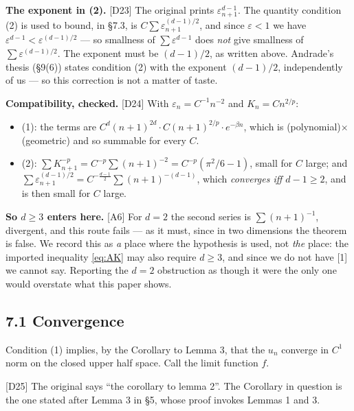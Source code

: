 \documentclass[11pt,reqno]{amsart}
\theoremstyle{plain}
\theoremstyle{definition}
\theoremstyle{plain}
\theoremstyle{definition}
\theoremstyle{remark}
\newcommand{\Ledger}[1]{{\scriptsize\textsf{[#1]}}}
\begin{document}
\begin{expansion}
\textbf{The exponent in (2).} \Ledger{D23} The original prints
$\varepsilon_{n+1}^{d-1}$. The quantity condition (2) is used to bound, in \S7.3, is
$C\sum\varepsilon_{n+1}^{(d-1)/2}$, and since $\varepsilon<1$ we have
$\varepsilon^{d-1}<\varepsilon^{(d-1)/2}$ --- so smallness of
$\sum\varepsilon^{d-1}$ does \emph{not} give smallness of
$\sum\varepsilon^{(d-1)/2}$. The exponent must be $(d-1)/2$, as written above. Andrade's thesis (\S9(6)) states condition (2) with the exponent $(d-1)/2$, independently of us --- so this correction is not a matter of taste.

\textbf{Compatibility, checked.} \Ledger{D24} With
$\varepsilon_n=C^{-1}n^{-2}$ and $K_n=Cn^{2/p}$:
\begin{itemize}[leftmargin=1.4em,itemsep=2pt]
\item (1): the terms are
  $C^{d}(n+1)^{2d}\cdot C(n+1)^{2/p}\cdot e^{-\beta n}$, which is
  (polynomial)$\times$(geometric) and so summable for every $C$.
\item (2): $\sum K_{n+1}^{-p}=C^{-p}\sum(n+1)^{-2}=C^{-p}(\pi^2/6-1)$, small for
  $C$ large; and
  $\sum\varepsilon_{n+1}^{(d-1)/2}
   =C^{-\frac{d-1}2}\sum(n+1)^{-(d-1)}$, which \emph{converges iff $d-1\ge2$}, and
  is then small for $C$ large.
\end{itemize}
\textbf{So $d\ge3$ enters here.} \Ledger{A6} For $d=2$ the second series is
$\sum(n+1)^{-1}$, divergent, and this route fails --- as it must, since in two
dimensions the theorem is false. We record this as \emph{a} place where the
hypothesis is used, not \emph{the} place: the imported inequality \eqref{eq:AK} may
also require $d\ge3$, and since we do not have [1] we cannot say. Reporting the
$d=2$ obstruction as though it were the only one would overstate what this paper
shows.
\end{expansion}

\subsection*{7.1 Convergence}

Condition (1) implies, by the Corollary to Lemma 3, that the $u_n$ converge in $C^1$
norm on the closed upper half space. Call the limit function $f$.

\begin{expansion}
\Ledger{D25} The original says ``the corollary to lemma 2''. The Corollary in
question is the one stated after Lemma 3 in \S5, whose proof invokes Lemmas 1 and 3.
\end{expansion}
\end{document}
